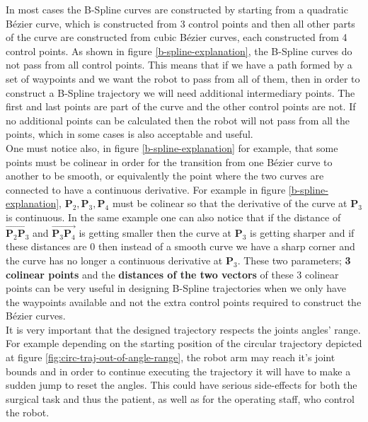 In most cases the B-Spline curves are constructed by starting from a quadratic B\'ezier curve, which is constructed from 3 control points and then all other 
parts of the curve are constructed from cubic B\'ezier curves, each constructed from 4 control points. As shown in figure \ref{b-spline-explanation}, the B-Spline 
curves do not pass from all control points. This means that if we have a path formed by a set of waypoints and we want the robot to pass from all of them, then 
in order to construct a B-Spline trajectory we will need additional intermediary points. The first and last points are part of the curve and the other control 
points are not. If no additional points can be calculated then the robot will not pass from all the points, which in some cases is also acceptable and useful. \\

One must notice also, in figure \ref{b-spline-explanation} for example, that some points must be colinear in order for the transition from one B\'ezier curve to another to be smooth, or equivalently 
the point where the two curves are connected to have a continuous derivative. For example in figure \ref{b-spline-explanation}, $\mathbf{P}_2, \mathbf{P}_3, \mathbf{P}_4$ must be colinear so that the 
derivative of the curve at $\mathbf{P}_3$ is continuous. In the same example one can also notice that if the distance of $\overrightarrow{\mathbf{P}_2\mathbf{P}_3}$ and $\overrightarrow{\mathbf{P}_3\mathbf{P}_4}$ 
is getting smaller then the curve at $\mathbf{P}_3$ is getting sharper and if these distances are $0$ then instead of a smooth curve we have a sharp corner and the curve has 
no longer a continuous derivative at $\mathbf{P}_3$. These two parameters; \textbf{3 colinear points} and the \textbf{distances of the two vectors} of these 3 colinear points can be very useful in designing 
B-Spline trajectories when we only have the waypoints available and not the extra control points required to construct the B\'ezier curves.\\

It is very important that the designed trajectory respects the joints angles' range. For example
depending on the starting position of the circular trajectory depicted at figure 
\ref{fig:circ-traj-out-of-angle-range}, the robot arm may reach it's joint bounds and in order to 
continue executing the trajectory it will have to make a sudden jump to reset the angles. 
This could have serious side-effects for both the surgical task and thus the patient, as well as 
for the operating staff, who control the robot.

